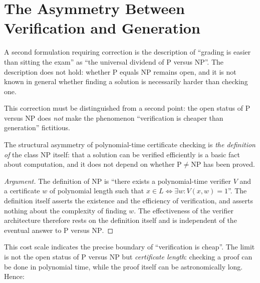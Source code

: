 \section{The Asymmetry Between Verification and Generation}\label{sec:asymmetry}

A second formulation requiring correction is the description of ``grading is easier than
sitting the exam'' as ``the universal dividend of $\mathrm{P}$ versus $\mathrm{NP}$''. The
description does not hold: whether $\mathrm{P}$ equals $\mathrm{NP}$ remains open, and it is
not known in general whether finding a solution is necessarily harder than checking one.

This correction must be distinguished from a second point: the open status of
$\mathrm{P}$ versus $\mathrm{NP}$ does \emph{not} make the phenomenon ``verification is
cheaper than generation'' fictitious.

\begin{proposition}\label{prop:asym-struct}
The structural asymmetry of polynomial-time certificate checking is \emph{the definition of}
the class $\mathrm{NP}$ itself: that a solution can be verified efficiently is a basic fact
about computation, and it does not depend on whether $\mathrm{P} \neq \mathrm{NP}$ has been
proved.
\end{proposition}

\begin{proof}[Argument]
The definition of $\mathrm{NP}$ is ``there exists a polynomial-time verifier $V$ and a
certificate $w$ of polynomial length such that
$x \in L \iff \exists w: V(x,w) = 1$''. The definition itself asserts the existence and the
efficiency of verification, and asserts nothing about the complexity of finding $w$. The
effectiveness of the verifier architecture therefore rests on the definition itself and is
independent of the eventual answer to $\mathrm{P}$ versus $\mathrm{NP}$.
\end{proof}

This cost scale indicates the precise boundary of ``verification is cheap''. The limit is
not the open status of $\mathrm{P}$ versus $\mathrm{NP}$ but \emph{certificate length}:
checking a proof can be done in polynomial time, while the proof itself can be
astronomically long. Hence:

